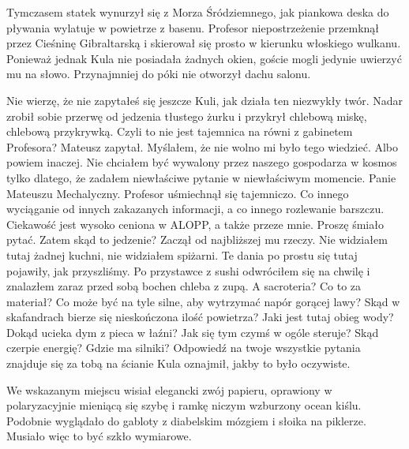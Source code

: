 Tymczasem statek wynurzył się z Morza Śródziemnego, jak piankowa deska do pływania wylatuje w powietrze z basenu. 
Profesor niepostrzeżenie przemknął przez Cieśninę Gibraltarską i skierował się prosto w kierunku włoskiego wulkanu.
Ponieważ jednak Kula nie posiadała żadnych okien, goście mogli jedynie uwierzyć mu na słowo. Przynajmniej do póki nie otworzył dachu salonu.

\begin{dialogue}
\ds{} Nie wierzę, że nie zapytałeś się jeszcze Kuli, jak działa ten niezwykły twór. \dm{} Nadar zrobił sobie przerwę od jedzenia 
tłustego żurku i przykrył chlebową miskę, chlebową przykrywką.
\ds{} Czyli to nie jest tajemnica na równi z gabinetem Profesora? \dm{} Mateusz zapytał. \dm{} Myślałem, że nie wolno mi było tego wiedzieć.
Albo powiem inaczej. Nie chciałem być wywalony przez naszego gospodarza w kosmos tylko dlatego, że zadałem niewłaściwe pytanie w niewłaściwym momencie.
\ds{} Panie Mateuszu Mechalyczny. \dm{} Profesor uśmiechnął się tajemniczo. \dm{} Co innego wyciąganie od innych zakazanych informacji, a co innego rozlewanie barszczu. 
Ciekawość jest wysoko ceniona w ALOPP, a także przeze mnie. Proszę śmiało pytać.
\ds{} Zatem skąd to jedzenie? \dm{} Zaczął od najbliższej mu rzeczy. \dm{} Nie widziałem tutaj żadnej kuchni, nie widziałem spiżarni.
Te dania po prostu się tutaj pojawiły, jak przyszliśmy. Po przystawce z sushi odwróciłem się na chwilę i znalazłem zaraz przed sobą bochen chleba z zupą.
A sacroteria? Co to za materiał? Co może być na tyle silne, aby wytrzymać napór gorącej lawy? 
Skąd w skafandrach bierze się nieskończona ilość powietrza? Jaki jest tutaj obieg wody? 
Dokąd ucieka dym z pieca w łaźni? Jak się tym czymś w ogóle steruje? Skąd czerpie energię? Gdzie ma silniki?
\ds{} Odpowiedź na twoje wszystkie pytania znajduje się za tobą na ścianie \dm{} Kula oznajmił, jakby to było oczywiste.
\end{dialogue}

We wskazanym miejscu wisiał elegancki zwój papieru, oprawiony w polaryzacyjnie mieniącą się szybę i ramkę niczym wzburzony ocean kiślu.
Podobnie wyglądało do gabloty z diabelskim mózgiem i słoika na piklerze. Musiało więc to być szkło wymiarowe.


